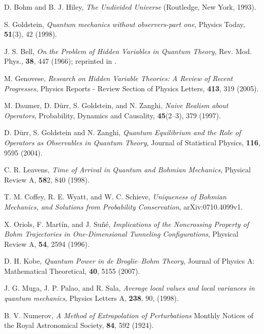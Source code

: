 \documentclass[onecolumn,nofootinbib, secnumarabic, amsmath, nobibnotes,11pt,aps,pra]{revtex4-1}
\begin{document}
\begin{thebibliography}{999}
D. Bohm and B. J. Hiley, \emph{The Undivided Universe} (Routledge, New York, 1993).

S. Goldstein, \emph{Quantum mechanics without observers-part one}, Physics Today, \textbf{51}(3),  42 (1998).

J. S. Bell, \emph{On the Problem of Hidden Variables in Quantum Theory}, Rev. Mod. Phys., \textbf{38},  447 (1966); reprinted in \cite{om.Bell1987}.

M. Genovese, \emph{Research on Hidden Variable Theories: A Review of Recent Progresses}, Physics Reports - Review Section of Physics Letters, \textbf{413},  319 (2005).

M. Daumer, D. D\"{u}rr, S. Goldstein, and N. Zanghi, \emph{Naive Realism about Operators}, Probability, Dynamics and Causality, \textbf{45}(2--3),  379 (1997).

D. D\"{u}rr, S. Goldstein and N. Zanghi, \emph{Quantum Equilibrium and the Role of Operators as Observables in Quantum Theory}, Journal of Statistical Physics, \textbf{116},  9595 (2004).

C. R. Leavens, \emph{Time of Arrival in Quantum and Bohmian Mechanics}, Physical Review A, \textbf{58}2,  840 (1998).

T. M. Coffey, R. E. Wyatt, and W. C. Schieve, \emph{Uniqueness of Bohmian Mechanics, and Solutions from Probability Conservation}, arXiv:0710.4099v1.

X. Oriols, F. Mart\'{i}n, and J. Su\~{n}\'{e}, \emph{Implications of the Noncrossing Property of Bohm Trajectories in One-Dimensional Tunneling Configurations}, Physical Review A, \textbf{54},  2594 (1996).

D. H. Kobe, \emph{Quantum Power in de Broglie--Bohm Theory}, Journal of Physics A: Mathematical Theoretical, \textbf{40},  5155 (2007).

J. G. Muga, J. P. Palao, and R. Sala, \emph{ Average local values and local variances in quantum mechanics},  Physics Letters A, {\bf 238},  90, (1998).

B. V. Numerov, \emph{A Method of Extrapolation of Perturbations} Monthly Notices of the Royal Astronomical Society, \textbf{84},  592 (1924).


\end{thebibliography}
\end{document}

